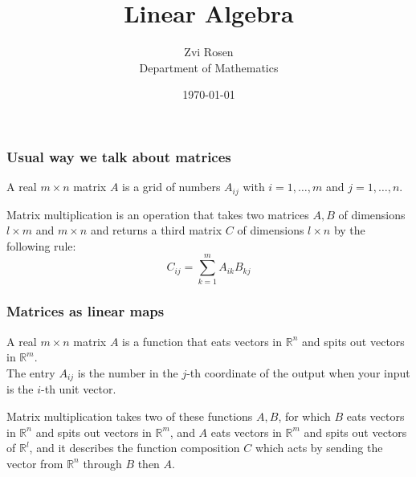 \documentclass[12pt]{beamer}
\newcommand{\RR}{\ensuremath{\mathbb{R}}}
\theoremstyle{definition}
\begin{document}
\author[Z. Rosen]{Zvi Rosen \\ Department of Mathematics}

\date[\today]{\today}
\title[Matrices]{{\Large Linear Algebra}}


\frame{\titlepage}

\begin{frame}
\frametitle{Usual way we talk about matrices}

A real $m\times n$ matrix $A$ is a grid of numbers $A_{ij}$
with $i = 1,\ldots,m$ and $j = 1,\ldots,n$.
\vspace{2mm}

Matrix multiplication is an operation that takes two matrices
$A,B$ of dimensions $l\times m$ and $m\times n$ and returns a third matrix 
$C$ of dimensions $l \times n$ by the following rule:
\[ C_{ij} = \sum_{k = 1}^m A_{ik} B_{kj}
\]
\end{frame}

\begin{frame}
\frametitle{Matrices as linear maps}


A real $m\times n$ matrix $A$ is a function that
eats vectors in $\RR^n$ and spits out vectors in $\RR^m$.\\
\vspace{2mm}
The entry $A_{ij}$ is the number in the $j$-th coordinate of the
output when your input is the $i$-th unit vector.
\vspace{2mm}

Matrix multiplication takes two of these functions $A,B$, for which
$B$ eats vectors in $\RR^n$ and spits out vectors in $\RR^m$, and
$A$ eats vectors in $\RR^m$ and spits out vectors of $\RR^l$, and it
describes the function composition $C$ which acts by sending the
vector from $\RR^n$ through $B$ then $A$.
\end{frame}
\end{document}

